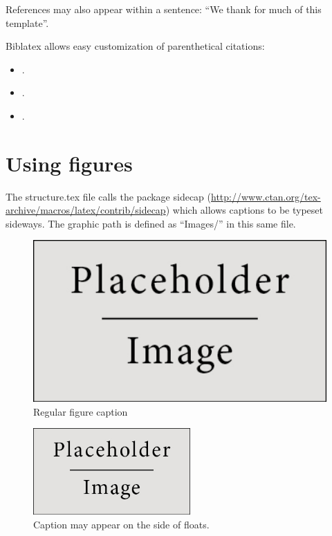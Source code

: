 \documentclass[11pt,fleqn]{book} %
\begin{document}
References may also appear within a sentence: ``We thank \textcite{legrand_legrand_2013} for much of
this template''. 

Biblatex allows easy customization of parenthetical citations:

\begin{itemize}
  \item \parencite[p. 180]{darwin_origin_1859}.
   \item \parencite[revisão em][]{darwin_origin_1859}.
  \item \parencite[ver][p. 180]{darwin_origin_1859}.
\end{itemize}

\section{Using figures}


The structure.tex file calls the package sidecap (\url{http://www.ctan.org/tex-archive/macros/latex/contrib/sidecap})
which allows captions to be typeset sideways.
The graphic path is defined as ``Images/'' in this same file.


 \begin{figure}
\centering
\includegraphics[width=14cm]{Figures/1-regular-chapter/placeholder.jpg}
 \caption{Regular figure caption}
\end{figure}

\begin{figure}
\centering
\includegraphics[width=6cm]{Figures/1-regular-chapter/placeholder.jpg}
 \caption{
Caption may appear on the side of floats.
 \vspace{8pt}}
\end{figure}
\end{document}

